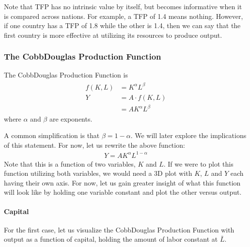\documentclass[letterpaper,10pt,english]{jupyterBook}
\begin{document}
\sphinxAtStartPar
Note that TFP has no intrinsic value by itself, but becomes informative when it is compared across nations. For example, a TFP of 1.4 means nothing. However, if one country has a TFP of 1.8 while the other is 1.4, then we can say that the first country is more effective at utilizing its resources to produce output.


\subsubsection{The Cobb\sphinxhyphen{}Douglas Production Function}
\label{\detokenize{content/04-production/production:the-cobb-douglas-production-function}}
\sphinxAtStartPar
The Cobb\sphinxhyphen{}Douglas Production Function is
\begin{equation*}
\begin{split}\begin{aligned}
f(K, L) &= K^\alpha L^\beta \\
 Y &= A \cdot f(K, L) \\
 &= A K^\alpha L^\beta
\end{aligned}\end{split}
\end{equation*}
\sphinxAtStartPar
where \(\alpha\) and \(\beta\) are exponents.

\sphinxAtStartPar
A common simplification is that \(\beta = 1 - \alpha\). We will later explore the implications of this statement. For now, let us rewrite the above function:
\begin{equation*}
\begin{split}
Y = A K^\alpha L^{1 - \alpha}
\end{split}
\end{equation*}
\sphinxAtStartPar
Note that this is a function of two variables, \(K\) and \(L\). If we were to plot this function utilizing both variables, we would need a 3D plot with \(K\), \(L\) and \(Y\) each having their own axis. For now, let us gain greater insight of what this function will look like by holding one variable constant and plot the other versus output.


\paragraph{Capital}
\label{\detokenize{content/04-production/production:capital}}
\sphinxAtStartPar
For the first case, let us visualize the Cobb\sphinxhyphen{}Douglas Production Function with output as a function of capital, holding the amount of labor constant at \(\bar L\).
\end{document}
